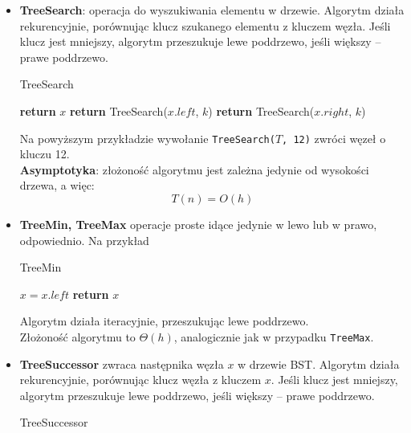 \documentclass[11pt,a4paper]{article}
\begin{document}
\begin{itemize}
    \item \textbf{TreeSearch}: operacja do wyszukiwania elementu w drzewie. Algorytm działa rekurencyjnie, porównując klucz szukanego elementu z kluczem węzła. Jeśli klucz jest mniejszy, algorytm przeszukuje lewe poddrzewo, jeśli większy -- prawe poddrzewo. \\
        \begin{algorithm}
            \caption{TreeSearch}
            \begin{algorithmic}[1]
                    \State \textbf{return} $x$
                    \State \textbf{return} TreeSearch($x.left$, $k$)
                \Else
                    \State \textbf{return} TreeSearch($x.right$, $k$)
                \EndIf
                \EndProcedure
            \end{algorithmic}
        \end{algorithm}
        Na powyższym przykładzie wywołanie \texttt{TreeSearch($T$, 12)} zwróci węzeł o kluczu 12.\\
        \textbf{Asymptotyka}: złożoność algorytmu jest zależna jedynie od wysokości drzewa, a więc:
        \[
            T(n) = O(h)
        \]
    \item \textbf{TreeMin, TreeMax} operacje proste idące jedynie w lewo lub w prawo, odpowiednio. Na przykład
        \begin{algorithm}
            \caption{TreeMin}
            \begin{algorithmic}[1]
                    \State $x = x.left$
                \EndWhile
                \State \textbf{return} $x$
                \EndProcedure
            \end{algorithmic}
        \end{algorithm}
        Algorytm działa iteracyjnie, przeszukując lewe poddrzewo.\\
        Złożoność algorytmu to $\Theta(h)$, analogicznie jak w przypadku \texttt{TreeMax}.
    \item \textbf{TreeSuccessor} zwraca następnika węzła $x$ w drzewie BST. Algorytm działa rekurencyjnie, porównując klucz węzła z kluczem $x$. Jeśli klucz jest mniejszy, algorytm przeszukuje lewe poddrzewo, jeśli większy -- prawe poddrzewo. \\
        \begin{algorithm}
            \caption{TreeSuccessor}

\end{algorithm}
\end{itemize}
\end{document}
